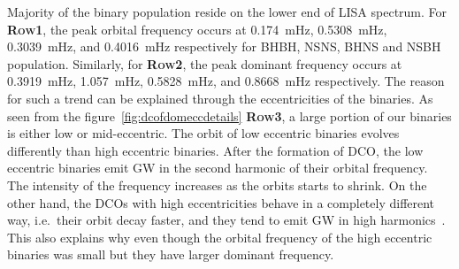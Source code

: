 \documentclass[journal, twocolumns]{IEEEtran}
\begin{document}
	Majority of the binary population reside on the lower end of LISA spectrum.
	For \textsc{\textbf{Row1}}, the peak orbital frequency occurs at \SI{0.174}{\milli\hertz}, \SI{0.5308}{\milli\hertz}, \SI{0.3039}{\milli\hertz}, and \SI{0.4016}{\milli\hertz} respectively for BHBH, NSNS, BHNS and NSBH population.
	Similarly, for \textsc{\textbf{Row2}}, the peak dominant frequency occurs at \SI{0.3919}{\milli\hertz}, \SI{1.057}{\milli\hertz}, \SI{0.5828}{\milli\hertz}, and \SI{0.8668}{\milli\hertz} respectively.
    The reason for such a trend can be explained through the eccentricities of the binaries.
    As seen from the figure~\ref{fig:dcofdomeccdetails} \textsc{\textbf{Row3}}, a large portion of our binaries is either low or mid-eccentric.
    The orbit of low eccentric binaries evolves differently than high eccentric binaries.
    After the formation of DCO, the low eccentric binaries emit GW in the second harmonic of their orbital frequency.
    The intensity of the frequency increases as the orbits starts to shrink.
    On the other hand, the DCOs with high eccentricities behave in a completely different way, i.e.\ their orbit decay faster, and they tend to emit GW in high harmonics~\cite{Peters1963, Peters1964}.
    This also explains why even though the orbital frequency of the high eccentric binaries was small but they have larger dominant frequency.
\end{document}
